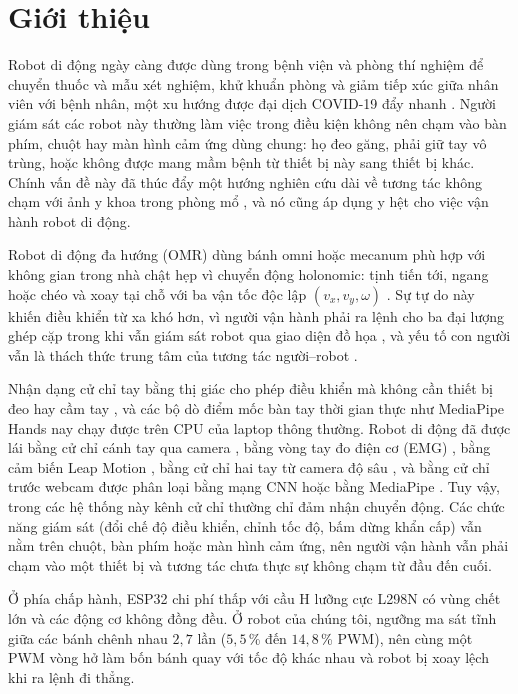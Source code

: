 \documentclass[5p,twocolumn]{elsarticle}
\begin{document}
\section{Giới thiệu}
Robot di động ngày càng được dùng trong bệnh viện và phòng thí nghiệm để chuyển thuốc và mẫu xét nghiệm, khử khuẩn phòng và giảm tiếp xúc giữa nhân viên với bệnh nhân, một xu hướng được đại dịch COVID-19 đẩy nhanh \cite{yang2020}. Người giám sát các robot này thường làm việc trong điều kiện không nên chạm vào bàn phím, chuột hay màn hình cảm ứng dùng chung: họ đeo găng, phải giữ tay vô trùng, hoặc không được mang mầm bệnh từ thiết bị này sang thiết bị khác. Chính vấn đề này đã thúc đẩy một hướng nghiên cứu dài về tương tác không chạm với ảnh y khoa trong phòng mổ \cite{wachs2008,ohara2014,mewes2017}, và nó cũng áp dụng y hệt cho việc vận hành robot di động.

Robot di động đa hướng (OMR) dùng bánh omni hoặc mecanum phù hợp với không gian trong nhà chật hẹp vì chuyển động holonomic: tịnh tiến tới, ngang hoặc chéo và xoay tại chỗ với ba vận tốc độc lập $(v_x, v_y, \omega)$ \cite{siegwart2011,taheri2015}. Sự tự do này khiến điều khiển từ xa khó hơn, vì người vận hành phải ra lệnh cho ba đại lượng ghép cặp trong khi vẫn giám sát robot qua giao diện đồ họa \cite{fong2001,chen2007}, và yếu tố con người vẫn là thách thức trung tâm của tương tác người--robot \cite{goodrich2007,sheridan2016}.

Nhận dạng cử chỉ tay bằng thị giác cho phép điều khiển mà không cần thiết bị đeo hay cầm tay \cite{mitra2007,wachs2011,rautaray2015,oudah2020}, và các bộ dò điểm mốc bàn tay thời gian thực như MediaPipe Hands \cite{zhang2020,lugaresi2019} nay chạy được trên CPU của laptop thông thường. Robot di động đã được lái bằng cử chỉ cánh tay qua camera \cite{waldherr2000}, bằng vòng tay đo điện cơ (EMG) \cite{bisi2018}, bằng cảm biến Leap Motion \cite{chen2024}, bằng cử chỉ hai tay từ camera độ sâu \cite{luo2019}, và bằng cử chỉ trước webcam được phân loại bằng mạng CNN \cite{zaman2023} hoặc bằng MediaPipe \cite{zick2024}. Tuy vậy, trong các hệ thống này kênh cử chỉ thường chỉ đảm nhận chuyển động. Các chức năng giám sát (đổi chế độ điều khiển, chỉnh tốc độ, bấm dừng khẩn cấp) vẫn nằm trên chuột, bàn phím hoặc màn hình cảm ứng, nên người vận hành vẫn phải chạm vào một thiết bị và tương tác chưa thực sự không chạm từ đầu đến cuối.

Ở phía chấp hành, ESP32 chi phí thấp với cầu H lưỡng cực L298N có vùng chết lớn \cite{tao1996} và các động cơ không đồng đều. Ở robot của chúng tôi, ngưỡng ma sát tĩnh giữa các bánh chênh nhau $2{,}7$ lần ($5{,}5$\,\% đến $14{,}8$\,\% PWM), nên cùng một PWM vòng hở làm bốn bánh quay với tốc độ khác nhau và robot bị xoay lệch khi ra lệnh đi thẳng.
\end{document}
